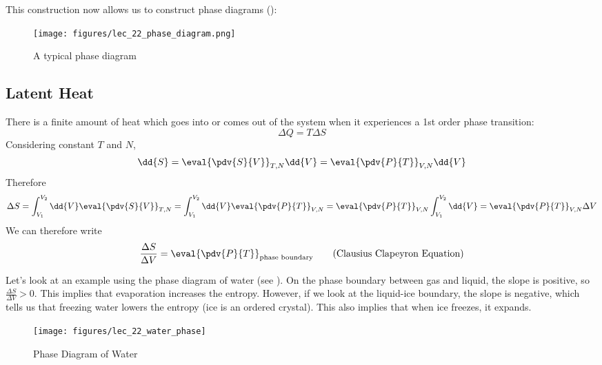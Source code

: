\documentclass[a4paper,twoside,master.tex]{subfiles}
\begin{document}
This construction now allows us to construct phase diagrams ():

\begin{figure}[h]
    \centering
    \texttt{[image: figures/lec\_22\_phase\_diagram.png]}
    \caption{A typical phase diagram}
    \label{fig:lec_22_phase_diagram}
\end{figure}

\subsection{Latent Heat}
\label{sub:latent_heat}

There is a finite amount of heat which goes into or comes out of the system when it experiences a 1st order phase transition:
\begin{equation}
    \Delta Q = T \Delta S
\end{equation}
Considering constant $ T $ and $ N $,
\begin{equation}
    \dd{S} = \eval{\pdv{S}{V}}_{T,N} \dd{V} = \eval{\pdv{P}{T}}_{V,N} \dd{V}
\end{equation}
Therefore
\begin{equation}
    \Delta S = \int_{V_1}^{V_2} \dd{V} \eval{\pdv{S}{V}}_{T,N} = \int_{V_1}^{V_2} \dd{V} \eval{\pdv{P}{T}}_{V,N} = \eval{\pdv{P}{T}}_{V,N} \int_{V_1}^{V_2} \dd{V} = \eval{\pdv{P}{T}}_{V,N} \Delta V
\end{equation}
We can therefore write
\begin{equation}\label{eq:clausius_clapeyron_equation}
    \frac{\Delta S}{\Delta V} = \eval{\pdv{P}{T}}_{\text{phase boundary}}\tag{Clausius Clapeyron Equation}
\end{equation}

\begin{ex}
    Let's look at an example using the phase diagram of water (see ). On the phase boundary between gas and liquid, the slope is positive, so $ \frac{\Delta S}{\Delta V} > 0 $. This implies that evaporation increases the entropy. However, if we look at the liquid-ice boundary, the slope is negative, which tells us that freezing water lowers the entropy (ice is an ordered crystal). This also implies that when ice freezes, it expands.

\end{ex}
\begin{figure}[h]
    \centering
    \texttt{[image: figures/lec\_22\_water\_phase]}
    \caption{Phase Diagram of Water}
    \label{fig:lec_22_water_phase}
\end{figure}
\end{document}
